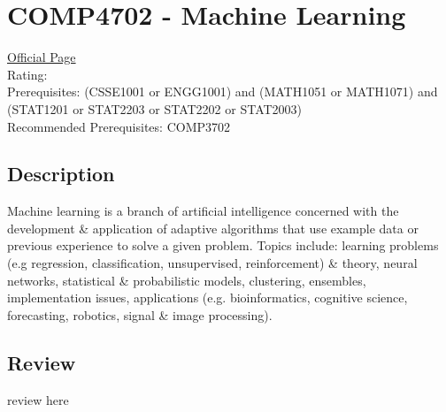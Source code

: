 \hypertarget{COMP4702}{\section{COMP4702 - Machine Learning}}

\large
\textcolor{turbo_purple}{\href{https://my.uq.edu.au/programs-courses/course.html?course_code=COMP4702}{Official Page}} \\
Rating: \cstar\cstar\cstar\cstar\ostar \\
Prerequisites: (CSSE1001 or ENGG1001) and (MATH1051 or MATH1071) and (STAT1201 or STAT2203 or STAT2202 or STAT2003) \\
Recommended Prerequisites: COMP3702

\normalsize
\subsection*{Description}
Machine learning is a branch of artificial intelligence concerned with the development \& application of adaptive algorithms that use example data or previous experience to solve a given problem.
Topics include: learning problems (e.g regression, classification, unsupervised, reinforcement) \& theory, neural networks, statistical \& probabilistic models, clustering, ensembles, implementation issues, applications (e.g. bioinformatics, cognitive science, forecasting, robotics, signal \& image processing).

\subsection*{Review}
review here
